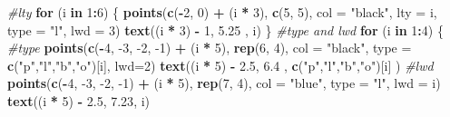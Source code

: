\documentclass[]{book}
\newenvironment{Shaded}{\begin{snugshade}}{\end{snugshade}}
\newcommand{\CommentTok}[1]{\textcolor[rgb]{0.56,0.35,0.01}{\textit{#1}}}
\newcommand{\ControlFlowTok}[1]{\textcolor[rgb]{0.13,0.29,0.53}{\textbf{#1}}}
\newcommand{\DataTypeTok}[1]{\textcolor[rgb]{0.13,0.29,0.53}{#1}}
\newcommand{\DecValTok}[1]{\textcolor[rgb]{0.00,0.00,0.81}{#1}}
\newcommand{\FloatTok}[1]{\textcolor[rgb]{0.00,0.00,0.81}{#1}}
\newcommand{\KeywordTok}[1]{\textcolor[rgb]{0.13,0.29,0.53}{\textbf{#1}}}
\newcommand{\NormalTok}[1]{#1}
\newcommand{\OperatorTok}[1]{\textcolor[rgb]{0.81,0.36,0.00}{\textbf{#1}}}
\newcommand{\StringTok}[1]{\textcolor[rgb]{0.31,0.60,0.02}{#1}}
\begin{document}
\begin{Shaded}
\begin{Highlighting}[]
\CommentTok{#lty}
\ControlFlowTok{for}\NormalTok{ (i }\ControlFlowTok{in} \DecValTok{1}\OperatorTok{:}\DecValTok{6}\NormalTok{) \{}
    \KeywordTok{points}\NormalTok{(}\KeywordTok{c}\NormalTok{(}\OperatorTok{-}\DecValTok{2}\NormalTok{, }\DecValTok{0}\NormalTok{) }\OperatorTok{+}\StringTok{ }\NormalTok{(i }\OperatorTok{*}\StringTok{ }\DecValTok{3}\NormalTok{), }\KeywordTok{c}\NormalTok{(}\DecValTok{5}\NormalTok{, }\DecValTok{5}\NormalTok{), }\DataTypeTok{col =} \StringTok{"black"}\NormalTok{, }\DataTypeTok{lty =}\NormalTok{ i, }\DataTypeTok{type =} \StringTok{"l"}\NormalTok{, }\DataTypeTok{lwd =} \DecValTok{3}\NormalTok{)}
    \KeywordTok{text}\NormalTok{((i }\OperatorTok{*}\StringTok{ }\DecValTok{3}\NormalTok{) }\OperatorTok{-}\StringTok{ }\DecValTok{1}\NormalTok{, }\FloatTok{5.25}\NormalTok{ , i)}
\NormalTok{\}}
\CommentTok{#type and lwd}
\ControlFlowTok{for}\NormalTok{ (i }\ControlFlowTok{in} \DecValTok{1}\OperatorTok{:}\DecValTok{4}\NormalTok{) \{}
    \CommentTok{#type}
    \KeywordTok{points}\NormalTok{(}\KeywordTok{c}\NormalTok{(}\OperatorTok{-}\DecValTok{4}\NormalTok{, }\DecValTok{-3}\NormalTok{, }\DecValTok{-2}\NormalTok{, }\DecValTok{-1}\NormalTok{) }\OperatorTok{+}\StringTok{ }\NormalTok{(i }\OperatorTok{*}\StringTok{ }\DecValTok{5}\NormalTok{), }\KeywordTok{rep}\NormalTok{(}\DecValTok{6}\NormalTok{, }\DecValTok{4}\NormalTok{),}
           \DataTypeTok{col =} \StringTok{"black"}\NormalTok{, }\DataTypeTok{type =} \KeywordTok{c}\NormalTok{(}\StringTok{"p"}\NormalTok{,}\StringTok{"l"}\NormalTok{,}\StringTok{"b"}\NormalTok{,}\StringTok{"o"}\NormalTok{)[i], }\DataTypeTok{lwd=}\DecValTok{2}\NormalTok{)}
    \KeywordTok{text}\NormalTok{((i }\OperatorTok{*}\StringTok{ }\DecValTok{5}\NormalTok{) }\OperatorTok{-}\StringTok{ }\FloatTok{2.5}\NormalTok{, }\FloatTok{6.4}\NormalTok{ , }\KeywordTok{c}\NormalTok{(}\StringTok{"p"}\NormalTok{,}\StringTok{"l"}\NormalTok{,}\StringTok{"b"}\NormalTok{,}\StringTok{"o"}\NormalTok{)[i] )}
    \CommentTok{#lwd}
    \KeywordTok{points}\NormalTok{(}\KeywordTok{c}\NormalTok{(}\OperatorTok{-}\DecValTok{4}\NormalTok{, }\DecValTok{-3}\NormalTok{, }\DecValTok{-2}\NormalTok{, }\DecValTok{-1}\NormalTok{) }\OperatorTok{+}\StringTok{ }\NormalTok{(i }\OperatorTok{*}\StringTok{ }\DecValTok{5}\NormalTok{), }\KeywordTok{rep}\NormalTok{(}\DecValTok{7}\NormalTok{, }\DecValTok{4}\NormalTok{), }\DataTypeTok{col =} \StringTok{"blue"}\NormalTok{, }\DataTypeTok{type =} \StringTok{"l"}\NormalTok{, }\DataTypeTok{lwd =}\NormalTok{ i)}
    \KeywordTok{text}\NormalTok{((i }\OperatorTok{*}\StringTok{ }\DecValTok{5}\NormalTok{) }\OperatorTok{-}\StringTok{ }\FloatTok{2.5}\NormalTok{, }\FloatTok{7.23}\NormalTok{, i)}

\end{Highlighting}
\end{Shaded}
\end{document}
